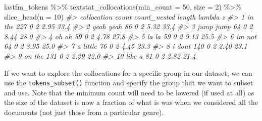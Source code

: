 \documentclass[
]{article}
\newenvironment{Shaded}{\begin{snugshade}}{\end{snugshade}}
\newcommand{\AttributeTok}[1]{\textcolor[rgb]{0.77,0.63,0.00}{#1}}
\newcommand{\CommentTok}[1]{\textcolor[rgb]{0.56,0.35,0.01}{\textit{#1}}}
\newcommand{\DecValTok}[1]{\textcolor[rgb]{0.00,0.00,0.81}{#1}}
\newcommand{\FunctionTok}[1]{\textcolor[rgb]{0.00,0.00,0.00}{#1}}
\newcommand{\NormalTok}[1]{#1}
\newcommand{\SpecialCharTok}[1]{\textcolor[rgb]{0.00,0.00,0.00}{#1}}
\begin{document}
\begin{Shaded}
\begin{Highlighting}[]
\NormalTok{lastfm\_tokens }\SpecialCharTok{\%\textgreater{}\%}
    \FunctionTok{textstat\_collocations}\NormalTok{(}\AttributeTok{min\_count =} \DecValTok{50}\NormalTok{, }\AttributeTok{size =} \DecValTok{2}\NormalTok{) }\SpecialCharTok{\%\textgreater{}\%}
    \FunctionTok{slice\_head}\NormalTok{(}\AttributeTok{n =} \DecValTok{10}\NormalTok{)}
\CommentTok{\#\textgreater{}    collocation count count\_nested length lambda    z}
\CommentTok{\#\textgreater{} 1       in the   227            0      2   2.95 33.4}
\CommentTok{\#\textgreater{} 2    yeah yeah    86            0      2   5.32 33.4}
\CommentTok{\#\textgreater{} 3    jump jump    64            0      2   8.44 28.0}
\CommentTok{\#\textgreater{} 4        oh oh    59            0      2   4.78 27.8}
\CommentTok{\#\textgreater{} 5        la la    59            0      2   9.13 25.5}
\CommentTok{\#\textgreater{} 6      i\textquotesingle{}m not    64            0      2   3.95 25.0}
\CommentTok{\#\textgreater{} 7     a little    76            0      2   4.45 23.3}
\CommentTok{\#\textgreater{} 8      i don\textquotesingle{}t   140            0      2   2.40 23.1}
\CommentTok{\#\textgreater{} 9       on the   131            0      2   2.29 22.0}
\CommentTok{\#\textgreater{} 10      like a    81            0      2   2.82 21.4}
\end{Highlighting}
\end{Shaded}

If we want to explore the collocations for a specific group in our dataset, we can use the \texttt{tokens\_subset()} function and specify the group that we want to subset and use. Note that the minimum count will need to be lowered (if used at all) as the size of the dataset is now a fraction of what is was when we considered all the documents (not just those from a particular genre).
\end{document}
